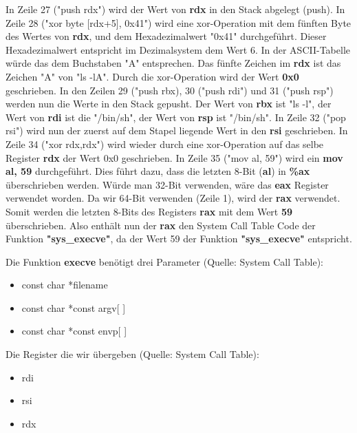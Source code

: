 \documentclass[12pt]{article}
\begin{document}
In Zeile 27 ("push rdx") wird der Wert von \textbf{rdx} in den Stack abgelegt (push).
In Zeile 28 ("xor byte [rdx+5], 0x41") wird eine xor-Operation mit dem fünften Byte des Wertes von \textbf{rdx}, und dem Hexadezimalwert "0x41" durchgeführt. Dieser Hexadezimalwert entspricht im Dezimalsystem dem Wert 6. In der ASCII-Tabelle würde das dem Buchstaben "A" entsprechen. Das fünfte Zeichen im \textbf{rdx} ist das Zeichen "A" von "ls -lA". Durch die xor-Operation wird der Wert \textbf{0x0} geschrieben. \newline
In den Zeilen 29 ("push rbx), 30 ("push rdi") und 31 ("push rsp") werden nun die Werte in den Stack gepusht. Der Wert von \textbf{rbx} ist "ls -l", der Wert von \textbf{rdi} ist die "/bin/sh", der Wert von \textbf{rsp} ist "/bin/sh". \newline
In Zeile 32 ("pop rsi") wird nun der zuerst auf dem Stapel liegende Wert in den \textbf{rsi} geschrieben. \newline
In Zeile 34 ("xor rdx,rdx") wird wieder durch eine xor-Operation auf das selbe Register \textbf{rdx} der Wert 0x0 geschrieben. \newline
In Zeile 35 ("mov al, 59") wird ein \textbf{mov al, 59} durchgeführt. Dies führt dazu, dass die letzten 8-Bit (\textbf{al}) in \textbf{\%ax} überschrieben werden. Würde man 32-Bit verwenden, wäre das \textbf{eax} Register verwendet worden. Da wir 64-Bit verwenden (Zeile 1), wird der \textbf{rax} verwendet. Somit werden die letzten 8-Bits des Registers \textbf{rax} mit dem Wert \textbf{59} überschrieben. \newline
Also enthält nun der \textbf{rax} den System Call Table Code der Funktion \textbf{"sys\_execve"}, da der Wert 59 der Funktion \textbf{"sys\_execve"} entspricht.
\newpage

Die Funktion \textbf{execve} benötigt drei Parameter (Quelle: System Call Table):
\begin{itemize}
\item const char *filename
\item const char *const argv[ ]
\item const char *const envp[ ]
\end{itemize}

Die Register die wir übergeben (Quelle: System Call Table):
\begin{itemize}
\item rdi
\item rsi
\item rdx
\end{itemize}
\end{document}
